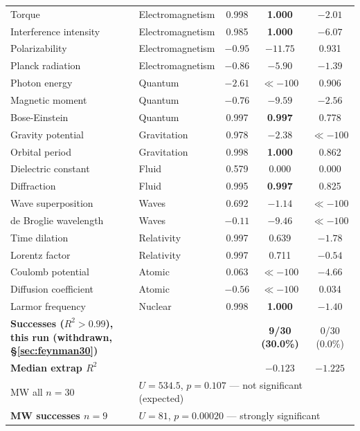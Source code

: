 \documentclass[twoside,11pt]{article}
\newcommand{\Rsq}{R^{2}}
\begin{document}
\begin{table}[h]
\begin{tabular}{llccc}
Torque                    & Electromagnetism & 0.998 & \textbf{1.000}   & $-2.01$ \\
Interference intensity    & Electromagnetism & 0.985 & \textbf{1.000}   & $-6.07$ \\
Polarizability            & Electromagnetism & $-0.95$ & $-11.75$       & 0.931 \\
Planck radiation          & Electromagnetism & $-0.86$ & $-5.90$        & $-1.39$ \\
Photon energy             & Quantum        & $-2.61$ & $\ll{-}100$      & 0.906 \\
Magnetic moment           & Quantum        & $-0.76$ & $-9.59$          & $-2.56$ \\
Bose-Einstein             & Quantum        & 0.997 & \textbf{0.997}     & 0.778 \\
Gravity potential         & Gravitation    & 0.978 & $-2.38$            & $\ll{-}100$ \\
Orbital period            & Gravitation    & 0.998 & \textbf{1.000}     & 0.862 \\
Dielectric constant       & Fluid          & 0.579 & 0.000              & 0.000 \\
Diffraction               & Fluid          & 0.995 & \textbf{0.997}     & 0.825 \\
Wave superposition        & Waves          & 0.692 & $-1.14$            & $\ll{-}100$ \\
de Broglie wavelength     & Waves          & $-0.11$ & $-9.46$          & $\ll{-}100$ \\
Time dilation             & Relativity     & 0.997 & 0.639              & $-1.78$ \\
Lorentz factor            & Relativity     & 0.997 & 0.711              & $-0.54$ \\
Coulomb potential         & Atomic         & 0.063 & $\ll{-}100$        & $-4.66$ \\
Diffusion coefficient     & Atomic         & $-0.56$ & $\ll{-}100$      & 0.034 \\
Larmor frequency          & Nuclear        & 0.998 & \textbf{1.000}     & $-1.40$ \\
\midrule\midrule
\textbf{Successes ($\Rsq>0.99$), this run (withdrawn, \S\ref{sec:feynman30})} & & & \textbf{9/30 (30.0\%)} & 0/30 (0.0\%) \\
\textbf{Median extrap $\Rsq$}    & & & $-0.123$               & $-1.225$ \\
MW all $n=30$       & \multicolumn{4}{l}{$U=534.5$, $p=0.107$ — not significant (expected)} \\
\textbf{MW successes $n=9$} & \multicolumn{4}{l}{$U=81$, $p=\mathbf{0.00020}$ — strongly significant} \\
\bottomrule
\end{tabular}
\end{table}
\end{document}
